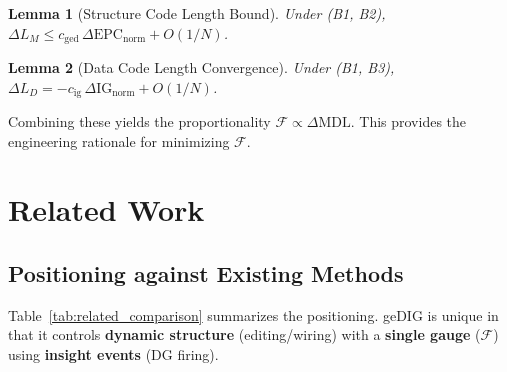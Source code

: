 \documentclass[12pt]{article}
\newtheorem{lemma}{Lemma}[section]
\newcommand{\F}{\mathcal{F}}
\newcommand{\gednorm}{\Delta\mathrm{EPC}_{\mathrm{norm}}}
\newcommand{\ignorm}{\Delta\mathrm{IG}_{\mathrm{norm}}}
\begin{document}
\begin{lemma}[Structure Code Length Bound]
Under (B1, B2), $\Delta L_M \le c_{\mathrm{ged}}\,\gednorm + O(1/N)$.
\end{lemma}
\begin{lemma}[Data Code Length Convergence]
Under (B1, B3), $\Delta L_D = -c_{\mathrm{ig}}\,\ignorm + O(1/N)$.
\end{lemma}
Combining these yields the proportionality $\F \propto \Delta\mathrm{MDL}$. This provides the engineering rationale for minimizing $\F$.

\section{Related Work}
\label{sec:related_work}

\subsection{Positioning against Existing Methods}
Table~\ref{tab:related_comparison} summarizes the positioning.
geDIG is unique in that it controls \textbf{dynamic structure} (editing/wiring) with a \textbf{single gauge} ($\F$) using \textbf{insight events} (DG firing).

\begin{table}[H]
\centering
\caption{Comparison with Related Methods (Layer = Performance / Control / Theory)}
\label{tab:related_comparison}
\small
{}
\end{table}
\end{document}

